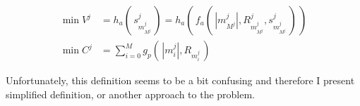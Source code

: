 \begin{align*}
	\min V^{j} & = h_{a}(\, s_{m_{M^{j}}^{j}}^{j} \,) = h_{a}(\, f_{a}(\, |m_{M^{j}}^{j}|, R_{m_{M^{j}}^{j}}^{j}, s_{m_{M^{j}}^{j}}^{j}\,) \,) \\
	\min C^{j} & = \sum_{i = 0}^{M} g_{p} (\, |m_{i}^{j}|, R_{m_{i}^{j}} \,)                                                                   
\end{align*}

\bigskip

\noindent Unfortunately, 
this definition seems to be a bit confusing
and therefore I present simplified definition, or another approach to the problem.